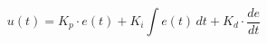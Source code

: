 \documentclass[border=8pt]{standalone}
\begin{document}
$$ u(t) = K_p \cdot e(t) + K_i \int e(t)\, dt + K_d \cdot \frac{de}{dt} $$
\end{document}
